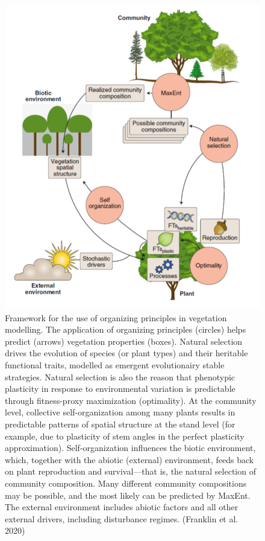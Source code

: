 \documentclass[12pt,oneside]{book}
\begin{document}
\begin{figure}

{\centering \includegraphics[width=0.8\linewidth]{figures/chap7/f719_franklin} 

}

\caption{Framework for the use of organizing principles in vegetation modelling. The application of organizing principles (circles) helps predict (arrows) vegetation properties (boxes). Natural selection drives the evolution of species (or plant types) and their heritable functional traits, modelled as emergent evolutionairy stable strategies. Natural selection is also the reason that phenotypic plasticity in response to environmental variation is predictable through fitness-proxy maximization (optimality). At the community level, collective self-organization among many plants results in predictable patterns of spatial structure at the stand level (for example, due to plasticity of stem angles in the perfect plasticity approximation). Self-organization influences the biotic environment, which, together with the abiotic (external) environment, feeds back on plant reproduction and survival—that is, the natural selection of community composition. Many different community compositions may be possible, and the most likely can be predicted by MaxEnt. The external environment includes abiotic factors and all other external drivers, including disturbance regimes. (Franklin et al. 2020)}\label{fig:f719}
\end{figure}
\end{document}
